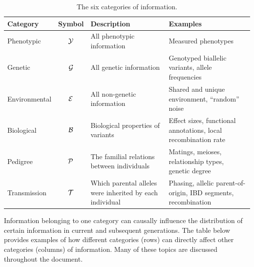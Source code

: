\documentclass[12pt]{article}
\numberwithin{equation}{section}
\begin{document}
\begin{table}[H]
    \begin{floatcard}
    \renewcommand{\arraystretch}{1.6}
    \setlength{\tabcolsep}{5pt}
    \footnotesize
    \begin{tabular}{l c >{\raggedright\arraybackslash}p{4.3cm} >{\raggedright\arraybackslash}p{5.9cm}}
        \textbf{Category} & \textbf{Symbol} & \textbf{Description} & \textbf{Examples} \\
        \hline
        Phenotypic    & $\mathcal{Y}$ & All phenotypic information & Measured phenotypes \\
        Genetic & $\mathcal{G}$ & All genetic information & Genotyped biallelic variants, allele frequencies \\
        Environmental & $\mathcal{E}$ & All non-genetic information & Shared and unique environment, ``random'' noise \\
        Biological & $\mathcal{B}$ & Biological properties of variants & Effect sizes, functional annotations, local recombination rate \\
        Pedigree      & $\mathcal{P}$ & The familial relations between individuals & Matings, meioses, relationship types, genetic degree \\
        Transmission  & $\mathcal{T}$ & Which parental alleles were inherited by each individual & Phasing, allelic parent-of-origin, IBD segments, recombination \\
    \end{tabular}
    \caption{%
        The six categories of information.%
    }
    \label{tab:info-categories}
    \end{floatcard}
\end{table}

Information belonging to one category can causally influence the distribution of certain information in current and subsequent generations.
The table below provides examples of how different categories (rows) can directly affect other categories (columns) of information.
Many of these topics are discussed throughout the document.
\end{document}
